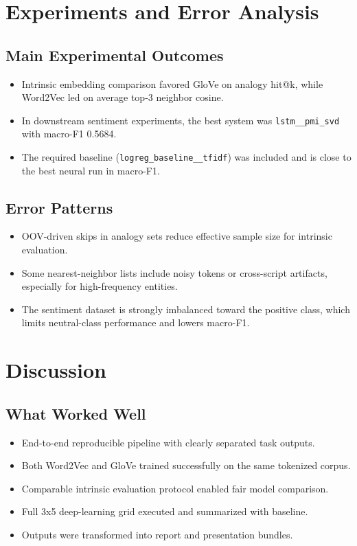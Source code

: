\documentclass[11pt]{article}
\newcommand{\bestMacro}{0.5684}
\begin{document}
\section{Experiments and Error Analysis}
\subsection{Main Experimental Outcomes}
\begin{itemize}
    \item Intrinsic embedding comparison favored GloVe on analogy hit@k, while Word2Vec led on average top-3 neighbor cosine.
    \item In downstream sentiment experiments, the best system was \texttt{lstm\_\_pmi\_svd} with macro-F1 \bestMacro.
    \item The required baseline (\texttt{logreg\_baseline\_\_tfidf}) was included and is close to the best neural run in macro-F1.
\end{itemize}

\subsection{Error Patterns}
\begin{itemize}
    \item OOV-driven skips in analogy sets reduce effective sample size for intrinsic evaluation.
    \item Some nearest-neighbor lists include noisy tokens or cross-script artifacts, especially for high-frequency entities.
    \item The sentiment dataset is strongly imbalanced toward the positive class, which limits neutral-class performance and lowers macro-F1.
\end{itemize}

\section{Discussion}
\subsection{What Worked Well}
\begin{itemize}
    \item End-to-end reproducible pipeline with clearly separated task outputs.
    \item Both Word2Vec and GloVe trained successfully on the same tokenized corpus.
    \item Comparable intrinsic evaluation protocol enabled fair model comparison.
    \item Full 3x5 deep-learning grid executed and summarized with baseline.
    \item Outputs were transformed into report and presentation bundles.
\end{itemize}
\end{document}

